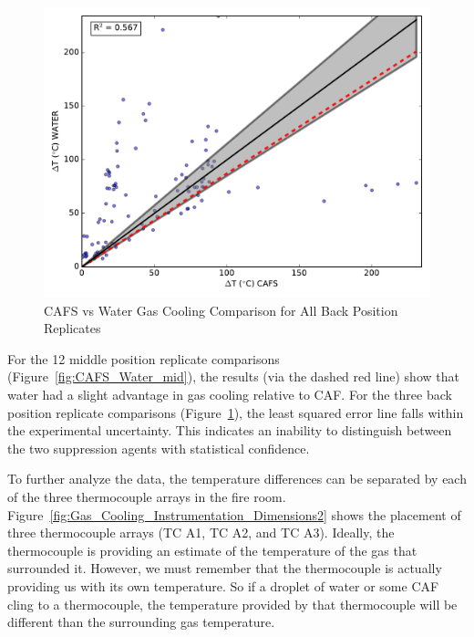 \documentclass[12pt,oneside]{book}
\begin{document}
\begin{figure}[!ht]
	\includegraphics[width=.7\columnwidth]{../Figures/Gas_Cooling/Combined_fullback_scatter}
	\caption{CAFS vs Water Gas Cooling Comparison for All Back Position Replicates}
	\label{fig:CAFS_Water_full}
\end{figure}

For the 12 middle position replicate comparisons (Figure~\ref{fig:CAFS_Water_mid}), the results (via the dashed red line) show that water had a slight advantage in gas cooling relative to CAF. For the three back position replicate comparisons (Figure~\ref{fig:CAFS_Water_full}), the least squared error line falls within the experimental uncertainty. This indicates an inability to distinguish between the two suppression agents with statistical confidence. 

To further analyze the data, the temperature differences can be separated by each of the three thermocouple arrays in the fire room. Figure~\ref{fig:Gas_Cooling_Instrumentation_Dimensions2} shows the placement of three thermocouple arrays (TC A1, TC A2, and TC A3). Ideally, the thermocouple is providing an estimate of the temperature of the gas that surrounded it. However, we must remember that the thermocouple is actually providing us with its own temperature. So if a droplet of water or some CAF cling to a thermocouple, the temperature provided by that thermocouple will be different than the surrounding gas temperature.  
\end{document}
